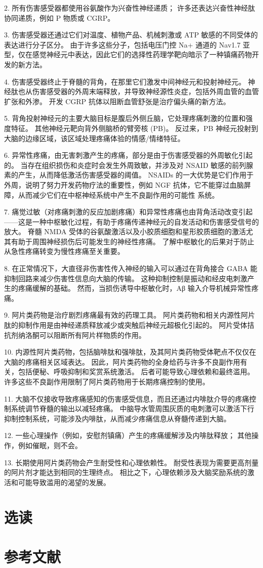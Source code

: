 2. 所有伤害感受器都使用谷氨酸作为兴奋性神经递质； 许多还表达兴奋性神经肽协同递质，例如 P 物质或 CGRP。 

3. 伤害感受器还通过它们对温度、植物产品、机械刺激或 ATP 敏感的不同受体的表达进行分子区分。 由于许多这些分子，包括电压门控 Na+ 通道的 Nav1.7 亚型，仅在感觉神经元中表达，因此它们的选择性药理学靶向暗示了一种镇痛药物开发的新方法。 

4. 伤害感受器终止于脊髓的背角，在那里它们激发中间神经元和投射神经元。 神经肽也从伤害感受器的外周末端释放，并导致神经源性炎症，包括外周血管的血管扩张和外渗。 开发 CGRP 抗体以阻断血管舒张是治疗偏头痛的新方法。 

5. 背角投射神经元的主要大脑目标是腹后外侧丘脑，它处理疼痛刺激的位置和强度特征。 其他神经元靶向背外侧脑桥的臂旁核 (PB)。 反过来，PB 神经元投射到大脑的边缘区域，该区域处理疼痛体验的情感/情绪特征。 

6. 异常性疼痛，由无害刺激产生的疼痛，部分是由于伤害感受器的外周敏化引起的。 当存在组织损伤和炎症时会发生外周致敏，并涉及对 NSAID 敏感的前列腺素的产生，从而降低激活伤害感受器的阈值。 NSAIDs 的一大优势是它们作用于外周，说明了努力开发药物疗法的重要性，例如 NGF 抗体，它不能穿过血脑屏障，从而减少它们在中枢神经系统中产生不良副作用的可能性 系统。 

7. 痛觉过敏（对疼痛刺激的反应加剧疼痛）和异常性疼痛也由背角活动改变引起——这是一种中枢敏化过程，有助于疼痛传递神经元的自发活动和伤害感受信号的放大。 脊髓 NMDA 受体的谷氨酸激活以及小胶质细胞和星形胶质细胞的激活尤其有助于周围神经损伤后可能发生的神经性疼痛。 了解中枢敏化的后果对于防止从急性疼痛转变为慢性疼痛至关重要。 

8. 在正常情况下，大直径非伤害性传入神经的输入可以通过在背角接合 GABA 能抑制回路来减少伤害性信息向大脑的传输。 这种抑制控制是振动和经皮电刺激产生的疼痛缓解的基础。 然而，当损伤诱导中枢敏化时，Aβ 输入介导机械异常性疼痛。 

9. 阿片类药物是治疗剧烈疼痛最有效的药理工具。 阿片类药物和相关内源性阿片肽的抑制作用是由神经递质释放减少或突触后神经元超极化引起的。 阿片受体拮抗剂纳洛酮可以阻断所有阿片样物质的作用。 

10. 内源性阿片类药物，包括脑啡肽和强啡肽，及其阿片类药物受体靶点不仅仅在大脑的疼痛相关区域表达。 因此，阿片类药物的全身给药与许多不良副作用有关，包括便秘、呼吸抑制和奖赏系统激活。 后者可能导致心理依赖和最终滥用。 许多这些不良副作用限制了阿片类药物用于长期疼痛控制的使用。 

11. 大脑不仅接收导致疼痛感知的伤害感受信息，而且还通过内啡肽介导的疼痛控制系统调节脊髓的输出以减轻疼痛。 中脑导水管周围灰质的电刺激可以激活下行抑制控制系统，可能涉及内啡肽，从而减少疼痛信息从脊髓传递到大脑。 

12. 一些心理操作（例如，安慰剂镇痛）产生的疼痛缓解涉及内啡肽释放； 其他操作，例如催眠，则不会。 

13. 长期使用阿片类药物会产生耐受性和心理依赖性。 耐受性表现为需要更高剂量的阿片剂才能达到相同的生理终点。 相比之下，心理依赖涉及大脑奖励系统的激活和可能导致滥用的渴望的发展。

\section{选读}
\section{参考文献}